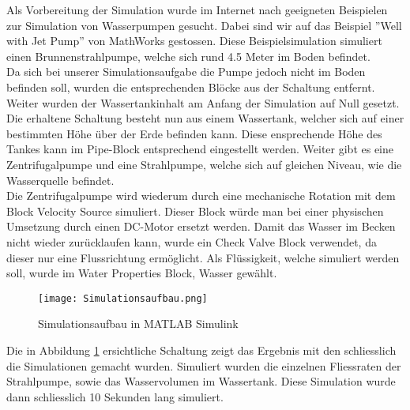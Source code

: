 Als Vorbereitung der Simulation wurde im Internet nach geeigneten Beispielen zur Simulation von Wasserpumpen gesucht. Dabei sind wir auf das Beispiel ''Well with Jet Pump'' \cite{MathWorks_JetPump} von MathWorks gestossen. Diese Beispielsimulation simuliert einen Brunnenstrahlpumpe, welche sich rund 4.5 Meter im Boden befindet.\\

Da sich bei unserer Simulationsaufgabe die Pumpe jedoch nicht im Boden befinden soll, wurden die entsprechenden Blöcke aus der Schaltung entfernt. Weiter wurden der Wassertankinhalt am Anfang der Simulation auf Null gesetzt. Die erhaltene Schaltung besteht nun aus einem Wassertank, welcher sich auf einer bestimmten Höhe über der Erde befinden kann. Diese ensprechende Höhe des Tankes kann im Pipe-Block entsprechend eingestellt werden. Weiter gibt es eine Zentrifugalpumpe und eine Strahlpumpe, welche sich auf gleichen Niveau, wie die Wasserquelle befindet.\\

Die Zentrifugalpumpe wird wiederum durch eine mechanische Rotation mit dem Block Velocity Source simuliert. Dieser Block würde man bei einer physischen Umsetzung durch einen DC-Motor ersetzt werden. Damit das Wasser im Becken nicht wieder zurücklaufen kann, wurde ein Check Valve Block verwendet, da dieser nur eine Flussrichtung ermöglicht. Als Flüssigkeit, welche simuliert werden soll, wurde im Water Properties Block, Wasser gewählt.\\

\begin{figure}[htb]
\texttt{[image: Simulationsaufbau.png]}
\caption{Simulationsaufbau in MATLAB Simulink}
\label{fig:Simulationsaufbau in MATLAB Simulink}
\end{figure}

Die in Abbildung \ref{fig:Simulationsaufbau in MATLAB Simulink} ersichtliche Schaltung zeigt das Ergebnis mit den schliesslich die Simulationen gemacht wurden. Simuliert wurden die einzelnen Fliessraten der Strahlpumpe, sowie das Wasservolumen im Wassertank. Diese Simulation wurde dann schliesslich 10 Sekunden lang simuliert.
